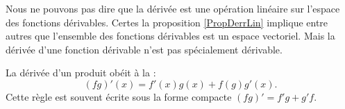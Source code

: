 \begin{remark}
    Nous ne pouvons pas dire que la dérivée est une opération linéaire sur l'espace des fonctions dérivables. Certes la proposition \ref{PropDerrLin} implique entre autres que l'ensemble des fonctions dérivables est un espace vectoriel. Mais la dérivée d'une fonction dérivable n'est pas spécialement dérivable.
\end{remark}

\begin{proposition}
    La dérivée d'un produit obéit à la :
    \begin{equation}
        (fg)'(x)=f'(x)g(x)+f(g)g'(x).
    \end{equation}
    Cette règle est souvent écrite sous la forme compacte $(fg)'=f'g+g'f$.
\end{proposition}

